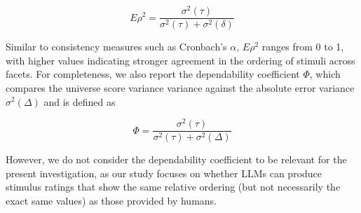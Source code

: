 \documentclass[12pt]{article}
\begin{document}
\begin{examplebox}
		\begin{equation} \label{eq.Erho}
			E\rho^2 = \frac{\sigma^2(\tau)}{\sigma^2(\tau) + \sigma^2(\delta)}
		\end{equation}
		
		Similar to consistency measures such as Cronbach’s $\alpha$, $E\rho^2$ ranges from 0 to 1, with higher values indicating stronger agreement in the ordering of stimuli across facets. For completeness, we also report the dependability coefficient $\Phi$, which compares the universe score variance variance against the absolute error variance $\sigma^2(\Delta)$ and is defined as
		
		\begin{equation} \label{eq.Phi}
			\Phi = \frac{\sigma^2(\tau)}{\sigma^2(\tau) + \sigma^2(\Delta)}
		\end{equation}
		
		However, we do not consider the dependability coefficient to be relevant for the present investigation, as our study focuses on whether LLMs can produce stimulus ratings that show the same relative ordering (but not necessarily the exact same values) as those provided by humans.\\
	\end{examplebox}
	
\end{document}
